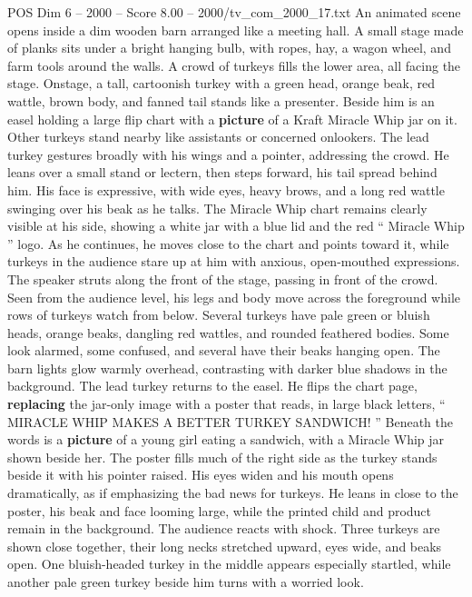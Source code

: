 \begin{textsample}{POS Dim 6 – 2000 – Score 8.00 – 2000/tv\_com\_2000\_17.txt}  \label{ex:f6_pos_056}
An animated scene opens inside a dim wooden barn arranged like a meeting hall.
A small stage made of planks sits under a bright hanging bulb, with ropes, hay, a wagon wheel, and farm tools around the walls.
A crowd of turkeys fills the lower area, all facing the stage.
Onstage, a tall, cartoonish turkey with a green head, orange beak, red wattle, brown body, and fanned tail stands like a presenter.
Beside him is an easel holding a large flip chart with a \textbf{picture} of a Kraft Miracle Whip jar on it.
Other turkeys stand nearby like assistants or concerned onlookers.
The lead turkey gestures broadly with his wings and a pointer, addressing the crowd.
He leans over a small stand or lectern, then steps forward, his tail spread behind him.
His face is expressive, with wide eyes, heavy brows, and a long red wattle swinging over his beak as he talks.
The Miracle Whip chart remains clearly visible at his side, showing a white jar with a blue lid and the red “ Miracle Whip ” logo.
As he continues, he moves close to the chart and points toward it, while turkeys in the audience stare up at him with anxious, open-mouthed expressions.
The speaker struts along the front of the stage, passing in front of the crowd.
Seen from the audience level, his legs and body move across the foreground while rows of turkeys watch from below.
Several turkeys have pale green or bluish heads, orange beaks, dangling red wattles, and rounded feathered bodies.
Some look alarmed, some confused, and several have their beaks hanging open.
The barn lights glow warmly overhead, contrasting with darker blue shadows in the background.
The lead turkey returns to the easel.
He flips the chart page, \textbf{replacing} the jar-only image with a poster that reads, in large black letters, “ MIRACLE WHIP MAKES A BETTER TURKEY SANDWICH! ” Beneath the words is a \textbf{picture} of a young girl eating a sandwich, with a Miracle Whip jar shown beside her.
The poster fills much of the right side as the turkey stands beside it with his pointer raised.
His eyes widen and his mouth opens dramatically, as if emphasizing the bad news for turkeys.
He leans in close to the poster, his beak and face looming large, while the printed child and product remain in the background.
The audience reacts with shock.
Three turkeys are shown close together, their long necks stretched upward, eyes wide, and beaks open.
One bluish-headed turkey in the middle appears especially startled, while another pale green turkey beside him turns with a worried look.

\end{textsample}
